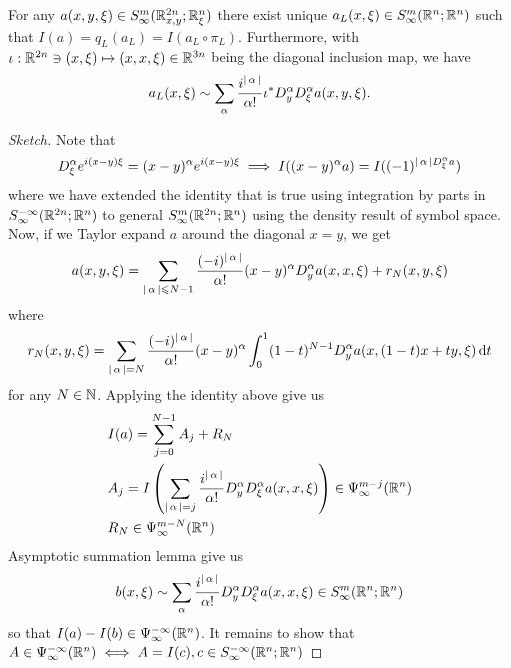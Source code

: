\documentclass{article}
\begin{document}
\begin{flemma}[Reduction] 
    For any $a(x, y, \xi) \in S^{m}_\infty(\R^{2n}_{x, y}; \R^n_\xi)$ there exist unique $a_L(x, \xi) \in S^{m}_\infty(\R^{n}; \R^n)$ such that $I(a) = q_L(a_L) = I(a_L \circ \pi_L)$. Furthermore, with $\iota : \R^{2n} \ni (x, \xi) \mapsto (x, x, \xi) \in \R^{3n}$ being the diagonal inclusion map, we have 
    \begin{align}
    a_L(x, \xi) \sim \sum_{\alpha} \frac{i^{\abs{\alpha}}}{\alpha !} \iota^* D^\alpha_y D^\alpha_\xi a(x, y, \xi). 
    \end{align}
\end{flemma}
\begin{proof}[Sketch] 
    Note that 
    \begin{align*}
    D_\xi^\alpha e^{i(x- y) \xi} = (x - y)^\alpha e^{i(x - y) \xi} \implies I((x -y)^\alpha a) = I((-1)^{\abs{\alpha}D_\xi^\alpha a})
    \end{align*}
    where we have extended the identity that is true using integration by parts in $S^{-\infty}_\infty(\R^{2n}; \R^n)$ to general $S^{m}_\infty(\R^{2n}; \R^n)$ using the density result of symbol space. Now, if we Taylor expand $a$ around the diagonal $x =y$, we get 
    \begin{align*}
    a(x, y, \xi) = \sum_{\abs{\alpha} \leq N -1} \frac{(-i)^{\abs{\alpha}}}{\alpha !} (x - y)^\alpha D^\alpha_ya (x, x, \xi) + r_N(x, y, \xi)
    \end{align*}
    where 
    \begin{align*}
    r_N(x, y, \xi) = \sum_{\abs{\alpha} = N} \frac{(-i)^{\abs{\alpha}}}{\alpha !} (x - y)^\alpha \int_0^1 (1 - t)^{N -1} D^\alpha_ya(x, (1 -t)x + ty, \xi) \d[t]
    \end{align*}
    for any $N \in \N$.  Applying the identity above give us 
    \begin{align*}
    &I(a) = \sum_{j = 0}^{N -1} A_j + R_N \\
    &A_j = I\brac{\sum_{\abs{\alpha} = j} \frac{i^{\abs{\alpha}}}{\alpha !} D^\alpha_y D^\alpha_\xi a (x, x, \xi)} \in \Psi^{m - j}_\infty(\R^n)\\
    &R_N \in \Psi^{m -N}_\infty(\R^n)
    \end{align*}
    Asymptotic summation lemma give us 
    \begin{align*}
    b(x, \xi) \sim \sum_{\alpha} \frac{i^{\abs{\alpha}}}{\alpha !} D^\alpha_y D^\alpha_\xi a (x, x, \xi) \in S^{m}_\infty(\R^{n}; \R^n)
    \end{align*}
    so that $I(a) - I(b) \in \Psi^{-\infty}_\infty(\R^n)$. It remains to show that $A \in \Psi^{-\infty}_\infty(\R^n) \iff A = I(c), c \in S^{-\infty}_\infty(\R^{n}; \R^n)$
\end{proof}
\end{document}
